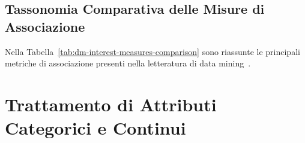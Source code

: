 \FloatBarrier
\subsection{Tassonomia Comparativa delle Misure di Associazione}
Nella Tabella~\ref{tab:dm-interest-measures-comparison} sono riassunte le principali metriche di associazione presenti nella letteratura di data mining~\cite{tan2018}.

\begin{table}[H]
\centering
\small
\renewcommand{\arraystretch}{1.2}
\caption{Formulazione analitica delle principali metriche di interesse statistico oggettive.}
\label{tab:dm-interest-measures-comparison}
\end{table}

\FloatBarrier
\section{Trattamento di Attributi Categorici e Continui}
\label{sec:dm-categorical-continuous-attributes}

